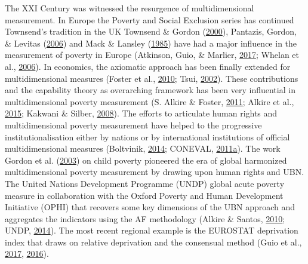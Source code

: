 \documentclass[]{book}
\begin{document}
The XXI Century was witnessed the resurgence of multidimensional measurement. In Europe the Poverty and Social Exclusion series has continued Townsend's tradition in the UK Townsend \& Gordon (\protect\hyperlink{ref-Townsend2000}{2000}), Pantazis, Gordon, \& Levitas (\protect\hyperlink{ref-Pantazis2006a}{2006}) and Mack \& Lansley (\protect\hyperlink{ref-Mack1985}{1985}) have had a major influence in the measurement of poverty in Europe (Atkinson, Guio, \& Marlier, \protect\hyperlink{ref-Atkinson2017}{2017}; Whelan et al., \protect\hyperlink{ref-Whelan2006a}{2006}). In economics, the axiomatic approach has been finally extended for multidimensional measures (Foster et al., \protect\hyperlink{ref-Foster2010a}{2010}; Tsui, \protect\hyperlink{ref-Tsui2002}{2002}). These contributions and the capability theory as overarching framework has been very influential in multidimensional poverty measurement (S. Alkire \& Foster, \protect\hyperlink{ref-Alkire2011a}{2011}; Alkire et al., \protect\hyperlink{ref-Alkire2015}{2015}; Kakwani \& Silber, \protect\hyperlink{ref-Kakwani2008a}{2008}). The efforts to articulate human rights and multidimensional poverty measurement have helped to the progressive institutionalisation either by nations or by international institutions of official multidimensional measures (Boltvinik, \protect\hyperlink{ref-Boltvinik2014}{2014}; CONEVAL, \protect\hyperlink{ref-CONEVAL2011a}{2011}\protect\hyperlink{ref-CONEVAL2011a}{a}). The work Gordon et al. (\protect\hyperlink{ref-Gordon2003}{2003}) on child poverty pioneered the era of global harmonized multidimensional poverty measurement by drawing upon human rights and UBN. The United Nations Development Programme (UNDP) global acute poverty measure in collaboration with the Oxford Poverty and Human Development Initiative (OPHI) that recovers some key dimensions of the UBN approach and aggregates the indicators using the AF methodology (Alkire \& Santos, \protect\hyperlink{ref-Alkire2010}{2010}; UNDP, \protect\hyperlink{ref-UNDP2014}{2014}). The most recent regional example is the EUROSTAT deprivation index that draws on relative deprivation and the consensual method (Guio et al., \protect\hyperlink{ref-Guio2017}{2017}, \protect\hyperlink{ref-Guio2016}{2016}).
\end{document}
